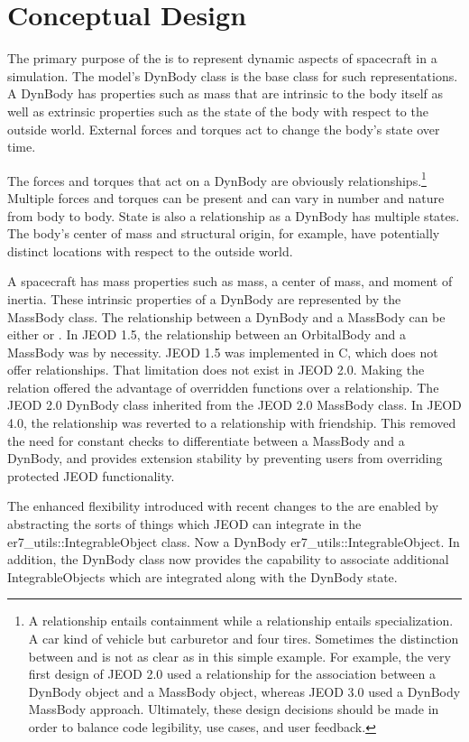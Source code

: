 \section{Conceptual Design}
The primary purpose of the \ModelDesc is to represent dynamic aspects of
spacecraft in a simulation.
The model's DynBody class is the base class for such representations.
A DynBody has properties such as mass that are intrinsic to the body itself
as well as extrinsic properties such as the state of the body with
respect to the outside world. External forces and torques act to change
the body's state over time.

The forces and torques that act on a DynBody are obviously \hasa
relationships.\footnote{A \hasa relationship entails containment while a \isa
relationship entails specialization. A car \isa kind of vehicle but \hasa carburetor and four tires. Sometimes the distinction between \isa and \hasa
is not as clear as in this simple example. For example, the very first design
of JEOD 2.0 used a \hasa relationship for the association between a DynBody
object and a MassBody object, whereas JEOD 3.0 used a DynBody \isa MassBody approach. Ultimately, these design decisions should be made in order to balance code legibility, use cases, and user feedback.}
Multiple forces and torques can be present and can vary in number
and nature from body to body.
State is also a \hasa relationship as a DynBody has multiple states.
The body's center of mass and structural origin, for example, have potentially
distinct locations with respect to the outside world.

A spacecraft has mass properties such as mass, a center of mass, and
moment of inertia.
These intrinsic properties of a DynBody are represented by the
 MassBody class. The relationship
between a DynBody and a MassBody can be either \hasa or \isa.
In JEOD 1.5, the relationship between an OrbitalBody
and a MassBody was \hasa by necessity. JEOD 1.5 was implemented in C,
which does not offer \isa relationships. That limitation does not
exist in JEOD 2.0. Making the relation \isa offered the advantage of overridden
functions over a \hasa relationship. The JEOD 2.0 DynBody class
inherited from the JEOD 2.0 MassBody class. In JEOD 4.0, the relationship was
reverted to a \hasa relationship with friendship. This removed the need for
constant checks to differentiate between a MassBody and a DynBody, and provides
 extension stability by preventing users from overriding protected JEOD
 functionality.

The enhanced flexibility introduced with recent changes to
the  \INTEGRATION are enabled by abstracting the
sorts of things which JEOD can integrate in the er7\_utils::IntegrableObject
class. Now a DynBody \isa er7\_utils::IntegrableObject.  In addition, the
DynBody class now provides the capability to associate additional
IntegrableObjects which are integrated along with the DynBody state.

